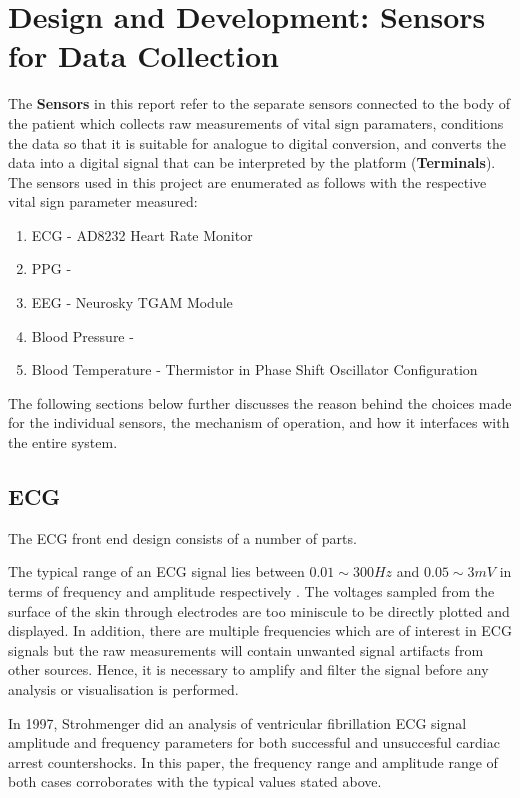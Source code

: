 \chapter{Design and Development: Sensors for Data Collection} 
\label{sensors}

The {\bf Sensors} in this report refer to the separate sensors connected to the body of the patient which collects raw measurements of vital sign paramaters, conditions the data so that it is suitable for analogue to digital conversion, and converts the data into a digital signal that can be interpreted by the platform ({\bf Terminals}). \\

The sensors used in this project are enumerated as follows with the respective vital sign parameter measured: 

\begin{enumerate}
	\item ECG - AD8232 Heart Rate Monitor 
	\item PPG - 
	\item EEG - Neurosky TGAM Module
	\item Blood Pressure - 
	\item Blood Temperature - Thermistor in Phase Shift Oscillator Configuration
\end{enumerate}

The following sections below further discusses the reason behind the choices made for the individual sensors, the mechanism of operation, and how it interfaces with the entire system. 

\section{ECG}

The ECG front end design consists of a number of parts. 

The typical range of an ECG signal lies between $0.01\sim 300Hz$ and $0.05\sim 3mV$ in terms of frequency and amplitude respectively \cite{nisignalamplitude}. The voltages sampled from the surface of the skin through electrodes are too miniscule to be directly plotted and displayed. In addition, there are multiple frequencies which are of interest in ECG signals but the raw measurements will contain unwanted signal artifacts from other sources. Hence, it is necessary to amplify and filter the signal before any analysis or visualisation is performed.  

In 1997, Strohmenger \cite{strohmenger1997analysis} did an analysis of ventricular fibrillation ECG signal amplitude and frequency parameters for both successful and unsuccesful cardiac arrest countershocks. In this paper, the frequency range and amplitude range of both cases corroborates with the typical values stated above.  



